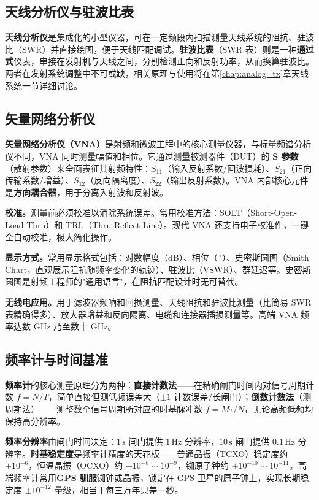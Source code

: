 \documentclass[12pt,UTF8]{ctexbook}
\begin{document}
\subsection{天线分析仪与驻波比表}

\textbf{天线分析仪}是集成化的小型仪器，可在一定频段内扫描测量天线系统的阻抗、驻波比（SWR）并直接绘图，便于天线匹配调试。\textbf{驻波比表}（SWR 表）则是一种\textbf{通过式}仪表，串接在发射机与天线之间，分别检测正向和反射功率，从而换算驻波比。两者在发射系统调整中不可或缺，相关原理与使用将在第\ref{chap:analog_tx}章天线系统一节详细讨论。

\subsection{矢量网络分析仪}

\textbf{矢量网络分析仪（VNA）}是射频和微波工程中的核心测量仪器，与标量频谱分析仪不同，VNA 同时测量幅值和相位。它通过测量被测器件（DUT）的 \textbf{S 参数}（散射参数）来全面表征其射频特性：$S_{11}$（输入反射系数/回波损耗）、$S_{21}$（正向传输系数/增益）、$S_{12}$（反向隔离度）、$S_{22}$（输出反射系数）。VNA 内部核心元件是\textbf{方向耦合器}，用于分离入射波和反射波。

\textbf{校准。}测量前必须校准以消除系统误差。常用校准方法：SOLT（Short-Open-Load-Thru）和 TRL（Thru-Reflect-Line）。现代 VNA 还支持电子校准件，一键全自动校准，极大简化操作。

\textbf{显示方式。}常用显示格式包括：对数幅度（$\mathrm{dB}$）、相位（$\mathrm{\,^\circ}$）、史密斯圆图（Smith Chart，直观展示阻抗随频率变化的轨迹）、驻波比（VSWR）、群延迟等。史密斯圆图是射频工程师的"通用语言"，在阻抗匹配设计时无可替代。

\textbf{无线电应用。}用于滤波器频响和回损测量、天线阻抗和驻波比测量（比简易 SWR 表精确得多）、放大器增益和反向隔离、电缆和连接器插损测量等。高端 VNA 频率达数 GHz 乃至数十 GHz。

\subsection{频率计与时间基准}

\textbf{频率计}的核心测量原理分为两种：\textbf{直接计数法}——在精确闸门时间内对信号周期计数 $f = N/T$，简单直接但测低频误差大（$\pm1$ 计数误差/长闸门）；\textbf{倒数计数法}（测周期法）——测整数个信号周期所对应的时基脉冲数 $f = M\tau/N$，无论高频低频均保持高分辨率。

\textbf{频率分辨率}由闸门时间决定：$1\,\mathrm{s}$ 闸门提供 $1\,\mathrm{Hz}$ 分辨率，$10\,\mathrm{s}$ 闸门提供 $0.1\,\mathrm{Hz}$ 分辨率。\textbf{时基稳定度}是频率计精度的天花板——普通晶振（TCXO）稳定度约 $\pm 10^{-6}$，恒温晶振（OCXO）约 $\pm 10^{-8}\sim 10^{-9}$，铷原子钟约 $\pm 10^{-10}\sim 10^{-11}$。高端频率计常用\textbf{GPS 驯服}铷钟或晶振，锁定在 GPS 卫星的原子钟上，实现长期稳定度 $\pm 10^{-12}$ 量级，相当于每三万年只差一秒。
\end{document}
